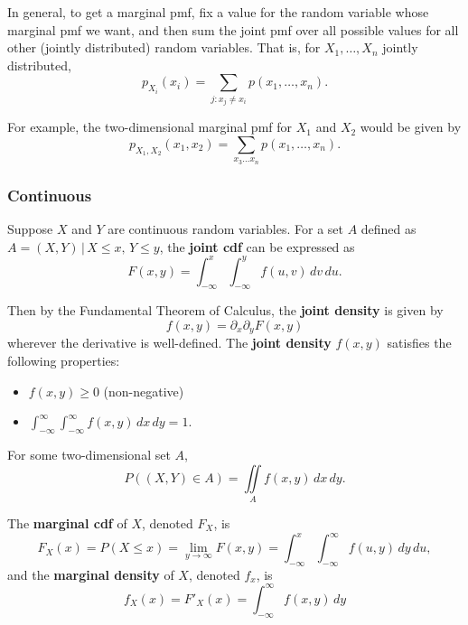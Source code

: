 \documentclass[a4paper,10pt]{article}
\begin{document}
In general, to get a marginal pmf, fix a value for the random variable whose marginal pmf we want, and then sum the joint pmf over all possible values for all other (jointly distributed) random variables. That is, for $X_1, \ldots, X_n$ jointly distributed, 
\begin{equation*}
    p_{X_i}(x_i) = \sum_{j:x_j\neq x_i} p(x_1, \ldots, x_n).
\end{equation*}

For example, the two-dimensional marginal pmf for $X_1$ and $X_2$ would be given by 
\begin{equation*}
    p_{X_1, X_2}(x_1, x_2) = \sum_{x_3\ldots x_n} p(x_1, \ldots, x_n).
\end{equation*}

\subsubsection{Continuous}

Suppose $X$ and $Y$ are continuous random variables. For a set $A$ defined as $A={(X, Y)\,|\,X\leq x,\,Y\leq y}$, the \textbf{joint cdf} can be expressed as
\begin{equation*}
    F(x, y) = \int_{-\infty}^x \int_{-\infty}^y f(u, v)\,dv\,du.
\end{equation*}

Then by the Fundamental Theorem of Calculus, the \textbf{joint density} is given by 
\begin{equation*}
    f(x, y) = \partial_x\partial_y F(x, y)
\end{equation*}
wherever the derivative is well-defined. The \textbf{joint density} $f(x, y)$ satisfies the following properties:
\begin{itemize}
    \item $f(x, y) \geq 0$ (non-negative)
    \item $\displaystyle \int_{-\infty}^{\infty}\int_{-\infty}^{\infty}f(x, y) \,dx\,dy = 1$.
\end{itemize}

For some two-dimensional set $A$, 
\begin{equation*}
    P((X, Y) \in A) = \iint \limits_A f(x, y) \,dx\,dy.
\end{equation*}

The \textbf{marginal cdf} of $X$, denoted $F_X$, is 
\begin{equation*}
    F_X(x) = P(X\leq x) = \lim_{y\to\infty}F(x, y) = \int_{-\infty}^x \int_{-\infty}^{\infty}f(u, y)\,dy\,du,
\end{equation*}
and the \textbf{marginal density} of $X$, denoted $f_x$, is 
\begin{equation*}
    f_X(x) = F'_X(x) = \int_{-\infty}^{\infty}f(x, y)\,dy 
\end{equation*}
\end{document}
